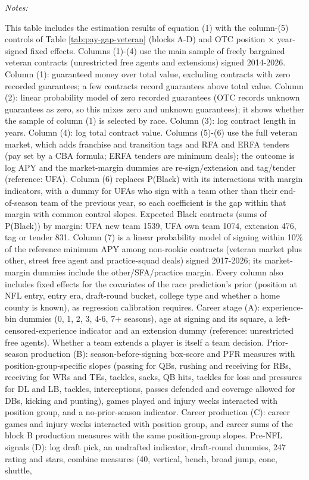 \begin{table}[!h]
{\begin{threeparttable}
\begin{tabular}[t]{lccccccc}
\end{tabular}
\begin{tablenotes}[para]
\item \textit{Notes:} 
\item This table includes the estimation results of equation (1) with the column-(5) controls of Table \ref{tab:pay-gap-veteran} (blocks A-D) and OTC position $\times$ year-signed fixed effects. Columns (1)-(4) use the main sample of freely bargained veteran contracts (unrestricted free agents and extensions) signed 2014-2026. Column (1): guaranteed money over total value, excluding contracts with zero recorded guarantees; a few contracts record guarantees above total value. Column (2): linear probability model of zero recorded guarantees (OTC records unknown guarantees as zero, so this mixes zero and unknown guarantees); it shows whether the sample of column (1) is selected by race. Column (3): log contract length in years. Column (4): log total contract value. Columns (5)-(6) use the full veteran market, which adds franchise and transition tags and RFA and ERFA tenders (pay set by a CBA formula; ERFA tenders are minimum deals); the outcome is log APY and the market-margin dummies are re-sign/extension and tag/tender (reference: UFA). Column (6) replaces P(Black) with its interactions with margin indicators, with a dummy for UFAs who sign with a team other than their end-of-season team of the previous year, so each coefficient is the gap within that margin with common control slopes. Expected Black contracts (sums of P(Black)) by margin: UFA new team 1539, UFA own team 1074, extension 476, tag or tender 831. Column (7) is a linear probability model of signing within 10\% of the reference minimum APY among non-rookie contracts (veteran market plus other, street free agent and practice-squad deals) signed 2017-2026; its market-margin dummies include the other/SFA/practice margin. Every column also includes fixed effects for the covariates of the race prediction's prior (position at NFL entry, entry era, draft-round bucket, college type and whether a home county is known), as regression calibration requires. Career stage (A): experience-bin dummies (0, 1, 2, 3, 4-6, 7+ seasons), age at signing and its square, a left-censored-experience indicator and an extension dummy (reference: unrestricted free agents). Whether a team extends a player is itself a team decision. Prior-season production (B): season-before-signing box-score and PFR measures with position-group-specific slopes (passing for QBs, rushing and receiving for RBs, receiving for WRs and TEs, tackles, sacks, QB hits, tackles for loss and pressures for DL and LB, tackles, interceptions, passes defended and coverage allowed for DBs, kicking and punting), games played and injury weeks interacted with position group, and a no-prior-season indicator. Career production (C): career games and injury weeks interacted with position group, and career sums of the block B production measures with the same position-group slopes. Pre-NFL signals (D): log draft pick, an undrafted indicator, draft-round dummies, 247 rating and stars, combine measures (40, vertical, bench, broad jump, cone, shuttle, 
\end{tablenotes}
\end{threeparttable}}
\end{table}
